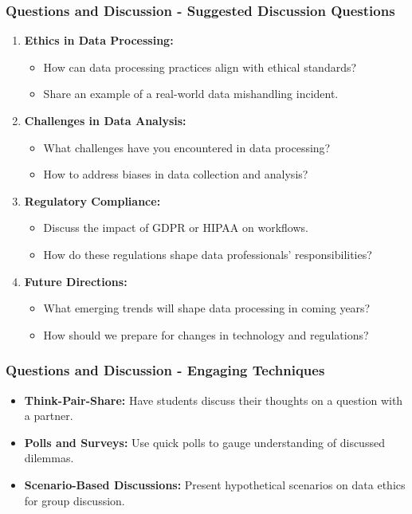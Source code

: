 \documentclass[aspectratio=169]{beamer}
\begin{document}
\begin{frame}[fragile]
    \frametitle{Questions and Discussion - Suggested Discussion Questions}
    \begin{enumerate}
        \item \textbf{Ethics in Data Processing:}
            \begin{itemize}
                \item How can data processing practices align with ethical standards?
                \item Share an example of a real-world data mishandling incident.
            \end{itemize}
        \item \textbf{Challenges in Data Analysis:}
            \begin{itemize}
                \item What challenges have you encountered in data processing?
                \item How to address biases in data collection and analysis?
            \end{itemize}
        \item \textbf{Regulatory Compliance:}
            \begin{itemize}
                \item Discuss the impact of GDPR or HIPAA on workflows.
                \item How do these regulations shape data professionals' responsibilities?
            \end{itemize}
        \item \textbf{Future Directions:}
            \begin{itemize}
                \item What emerging trends will shape data processing in coming years?
                \item How should we prepare for changes in technology and regulations?
            \end{itemize}
    \end{enumerate}
\end{frame}

\begin{frame}[fragile]
    \frametitle{Questions and Discussion - Engaging Techniques}
    \begin{itemize}
        \item \textbf{Think-Pair-Share:} Have students discuss their thoughts on a question with a partner.
        \item \textbf{Polls and Surveys:} Use quick polls to gauge understanding of discussed dilemmas.
        \item \textbf{Scenario-Based Discussions:} Present hypothetical scenarios on data ethics for group discussion.
    \end{itemize}
\end{frame}
\end{document}
